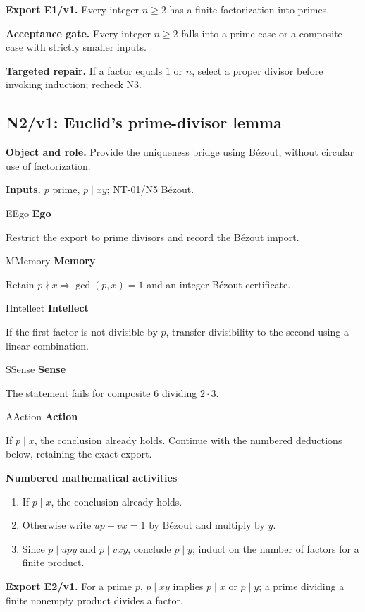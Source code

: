 \documentclass[preprint,12pt,aps,pra,showkeys,amsmath,amssymb,superscriptaddress,floatfix]{revtex4-2}
\theoremstyle{definition}
\theoremstyle{remark}
\newcommand{\mmfaculty}[3]{%
 \begin{mmfacultybox}{#1}{#2}
 {\sffamily\bfseries\color{MMBlue}#2}\par\smallskip #3
 \end{mmfacultybox}}
\newcommand{\field}[2]{\par\smallskip\noindent\textbf{#1.} #2\par}
\begin{document}
\field{Export E1/v1}{Every integer \(n\ge2\) has a finite factorization into primes.}

\field{Acceptance gate}{Every integer \(n\ge2\) falls into a prime case or a composite case with
strictly smaller inputs.}

\field{Targeted repair}{If a factor equals \(1\) or \(n\), select a proper divisor before
invoking induction; recheck N3.}

\clearpage

\subsection{N2/v1: Euclid's prime-divisor lemma}

\field{Object and role}{Provide the uniqueness bridge using Bézout, without circular use of
factorization.}

\field{Inputs}{\(p\) prime, \(p\mid xy\); NT-01/N5 Bézout.}

\mmfaculty{E}{Ego}{Restrict the export to prime divisors and record the Bézout import.}

\mmfaculty{M}{Memory}{Retain \(p\nmid x\Rightarrow\gcd(p,x)=1\) and an integer Bézout
certificate.}

\mmfaculty{I}{Intellect}{If the first factor is not divisible by \(p\), transfer divisibility to
the second using a linear combination.}

\mmfaculty{S}{Sense}{The statement fails for composite \(6\) dividing \(2\cdot3\).}

\mmfaculty{A}{Action}{If \(p\mid x\), the conclusion already holds. Continue with the numbered
deductions below, retaining the exact export.}

\smallskip\noindent\textbf{Numbered mathematical activities}

\begin{enumerate}[label=N2.\arabic*,leftmargin=3.4em]

\item If \(p\mid x\), the conclusion already holds.

\item Otherwise write \(up+vx=1\) by Bézout and multiply by \(y\).

\item Since \(p\mid upy\) and \(p\mid vxy\), conclude \(p\mid y\); induct on
the number of factors for a finite product.

\end{enumerate}

\field{Export E2/v1}{For a prime \(p\), \(p\mid xy\) implies \(p\mid x\) or \(p\mid y\); a
prime dividing a finite nonempty product divides a factor.}
\end{document}
